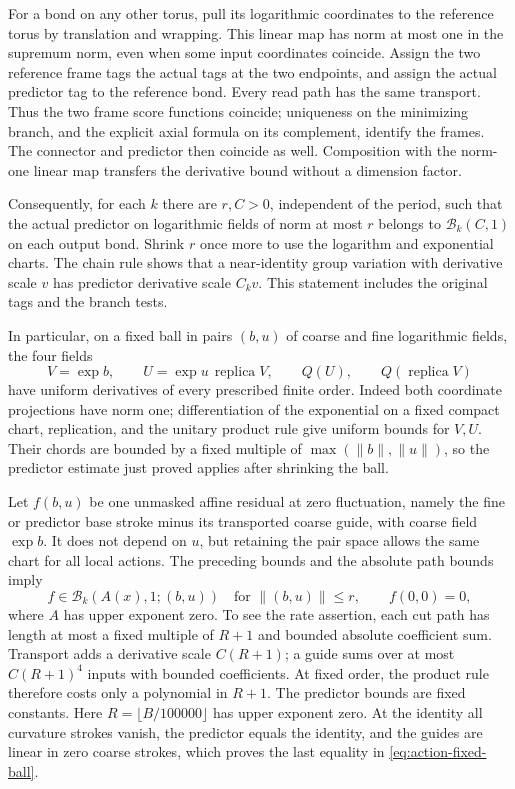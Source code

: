 For a bond on any other torus, pull its logarithmic coordinates to
the reference torus by translation and wrapping. This linear map
has norm at most one in the supremum norm, even when some input
coordinates coincide. Assign the two reference frame tags the actual
tags at the two endpoints, and assign the actual predictor tag to
the reference bond. Every read path has the same transport. Thus
the two frame score functions coincide; uniqueness on the minimizing
branch, and the explicit axial formula on its complement, identify
the frames. The connector and predictor then coincide as well.
Composition with the norm-one linear map transfers the derivative
bound without a dimension factor.

Consequently, for each $k$ there are $r,C>0$, independent of the
period, such that the actual predictor on logarithmic fields of
norm at most $r$ belongs to $\mathcal B_k(C,1)$ on each output
bond. Shrink $r$ once more to use the logarithm and exponential
charts. The chain rule shows that a near-identity group variation
with derivative scale $v$ has predictor derivative scale $C_kv$.
This statement includes the original tags and the branch tests.

In particular, on a fixed ball in pairs $(b,u)$ of coarse and fine
logarithmic fields, the four fields
\[
 V=\exp b,\qquad U=\exp u\,\operatorname{replica}V,
 \qquad Q(U),\qquad Q(\operatorname{replica}V)
\]
have uniform derivatives of every prescribed finite order.
Indeed both coordinate projections have norm one; differentiation
of the exponential on a fixed compact chart, replication, and the
unitary product rule give uniform bounds for $V,U$. Their chords
are bounded by a fixed multiple of $\max(\|b\|,\|u\|)$, so the
predictor estimate just proved applies after shrinking the ball.

Let $f(b,u)$ be one unmasked affine residual at zero fluctuation,
namely the fine or predictor base stroke minus its transported
coarse guide, with coarse field $\exp b$. It does not depend on $u$,
but retaining the pair space allows the same chart for all local
actions. The preceding bounds and the absolute path bounds imply
\begin{equation}\label{eq:action-fixed-ball}
 f\in\mathcal B_k(A(x),1;(b,u))
 \quad\text{for }\|(b,u)\|\le r,
 \qquad f(0,0)=0,
\end{equation}
where $A$ has upper exponent zero. To see the rate assertion, each
cut path has length at most a fixed multiple of $R+1$ and bounded
absolute coefficient sum. Transport adds a derivative scale
$C(R+1)$; a guide sums over at most $C(R+1)^4$ inputs with bounded
coefficients. At fixed order, the product rule therefore costs only
a polynomial in $R+1$. The predictor bounds are fixed constants.
Here $R=\lfloor B/100000\rfloor$ has upper exponent zero.
At the identity all curvature strokes vanish, the predictor equals
the identity, and the guides are linear in zero coarse strokes,
which proves the last equality in \eqref{eq:action-fixed-ball}.


